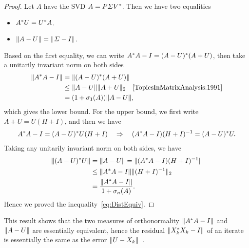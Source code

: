 \documentclass[12pt]{article}
\begin{document}
\begin{proof}
    Let $A$ have the SVD $A=P\varSigma V^*$. Then we have two equalities 
    \begin{itemize}
        \item $A^* U = U^* A$.
        \item $\|{A-U}\| = \|{\varSigma - I}\|$.
    \end{itemize}
    Based on the first equality, we can write $A^* A - I = (A-U)^* (A+U)$, then take a unitarily invariant norm on both sides 
    \begin{equation}
        \notag 
        \begin{aligned}
            \gnorm{A\ctp A - I} &= \gnorm{(A-U)\ctp (A+U)} \\
            & \leq \gnorm{A-U}\norm{A+U}\quad \text{\ycite[1991, Cor.~3.5.10]{TopicsInMatrixAnalysis:1991}}\\
            & = (1+\sigma_1(A))\gnorm{A-U},
        \end{aligned}
    \end{equation}
    which gives the lower bound. For the upper bound, we first write $A+U=U(H+I)$, and then we have 
    \begin{equation}
        \notag 
        A^* A - I = (A - U)^* U(H+I)\quad \Rightarrow \quad (A^* A - I)(H + I)^{-1} = (A-U)^* U.
    \end{equation}
    Taking any unitarily invariant norm on both sides, we have 
    \begin{equation}
        \notag
        \begin{aligned}
            \|{(A-U)^* U}\| &= \|{A-U}\| = \|{(A^* A - I)(H + I)^{-1}}\|\\
            & \leq \|{A^* A - I}\|\|{(H+I)^{-1}}\|_2 \\
            & = \frac{\|{A^* A - I}\|}{1+\sigma_n(A)}.
        \end{aligned}
    \end{equation}
    Hence we proved the inequality~\eqref{eq:DistEquiv}.
\end{proof}

This result shows that the two measures of orthonormality $\|{A^* A - I}\|$ and $\|{A-U}\|$ are essentially equivalent, hence the residual $\|{X_k^* X_k - I}\|$ of an iterate is essentially the same as the error $\|{U-X_k}\|$~.
\end{document}
